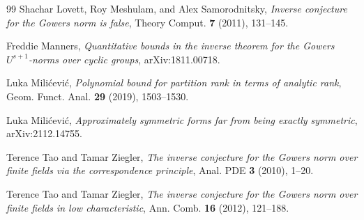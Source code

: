 \begin{thebibliography}{99}
Shachar Lovett, Roy Meshulam, and Alex Samorodnitsky, \emph{Inverse conjecture
  for the {G}owers norm is false}, Theory Comput. \textbf{7} (2011), 131--145.

Freddie Manners, \emph{Quantitative bounds in the inverse theorem for the
  {G}owers {$U^{s+ 1}$}-norms over cyclic groups}, arXiv:1811.00718.

Luka Mili\'{c}evi\'{c}, \emph{Polynomial bound for partition rank in terms of
  analytic rank}, Geom. Funct. Anal. \textbf{29} (2019), 1503--1530.

Luka Mili\'{c}evi\'{c}, \emph{Approximately symmetric forms far from being
  exactly symmetric}, arXiv:2112.14755.
  
Terence Tao and Tamar Ziegler, \emph{The inverse conjecture for the {G}owers
  norm over finite fields via the correspondence principle}, Anal. PDE
  \textbf{3} (2010), 1--20.

Terence Tao and Tamar Ziegler, \emph{The inverse conjecture for the {G}owers
  norm over finite fields in low characteristic}, Ann. Comb. \textbf{16}
  (2012), 121--188.

\end{thebibliography}
